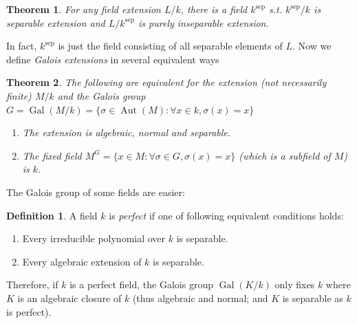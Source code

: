 \documentclass[12pt]{article}
\newtheorem{theorem}{Theorem}[subsection]
\theoremstyle{remark}
\theoremstyle{definition}
\newtheorem{definition}{Definition}[subsection]
\newcommand{\s}[0]{\sigma}
\newcommand{\Aut}[0]{\operatorname{Aut}}
\newcommand{\Gal}[0]{\operatorname{Gal}}
\newcommand{\comment}[1]{}
\begin{document}
        \begin{theorem}\label{theorem-sep-exist}
            For any field extension $L/k$, there is a field $k^{\text{sep}}$ s.t. $k^{\text{sep}}/k$ is separable extension and $L/k^{\text{sep}}$ is purely inseparable extension. 
        \end{theorem}
        \noindent In fact, $k^{\text{sep}}$ is just the field consisting of all separable elements of $L$. Now we define \textit{Galois extensions} in several equivalent ways
        \begin{theorem}
            The following are equivalent for the extension (not necessarily finite) $M/k$ and \textup{the Galois group} $G=\Gal(M/k) = \{\s\in\Aut(M):\forall x\in k, \s(x)=x\}$
            \begin{enumerate}[\normalfont(i)]
                \item The extension is algebraic, normal and separable.
                \item The \textup{fixed field} $M^G =\{x\in M:\forall \s\in G, \s(x)=x\}$ (which is a subfield of $M$) is $k$.
                \comment{
                \item $M$ is splitting field of a separable polynomial. 
                \item For the collection of fields $L$ s.t. $k \subseteq L \subseteq M$ and collection      of groups $H$ s.t. $1 \subseteq H \subseteq G$, there is a one-to-one         correspondence(called \textit{Galois correspondence}) between these two collections.        Namely $L \mapsto \text{Gal}(M/L)$ and $H \mapsto M^H$, these are inverses to each        other, and they are order reversing (e.g. larger field $L$ results in smaller $M/L$, so        $\text{Gal}(M/L)$ is smaller. ) }
            \end{enumerate}
        \end{theorem}
        The Galois group of some fields are easier: 
        \begin{definition}%
            A field $k$ is \textit{perfect} if one of following equivalent conditions holds: 
            \begin{enumerate}[\normalfont(i)]
                \item Every irreducible polynomial over $k$ is separable.
                \item Every algebraic extension of $k$ is separable.
            \end{enumerate}
        \end{definition}
    \noindent Therefore, if $k$ is a perfect field, the Galois group $\Gal(K/k)$ only fixes $k$ where $K$ is an algebraic closure of $k$ (thus algebraic and normal; and $K$ is separable as $k$ is perfect).
    
\end{document}
